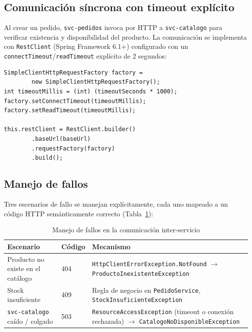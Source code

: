 \documentclass[11pt,a4paper]{article}
\begin{document}
\subsection{Comunicación síncrona con timeout explícito}

Al crear un pedido, \texttt{svc-pedidos} invoca por HTTP a
\texttt{svc-catalogo} para verificar existencia y disponibilidad del producto.
La comunicación se implementa con \texttt{RestClient} (Spring Framework 6.1+)
configurado con un \texttt{connectTimeout}/\texttt{readTimeout} explícito de
2 segundos:

\begin{lstlisting}[caption={Cliente HTTP con timeout explícito hacia \texttt{svc-catalogo}}, label={lst:catalogoclient}]
SimpleClientHttpRequestFactory factory =
        new SimpleClientHttpRequestFactory();
int timeoutMillis = (int) (timeoutSeconds * 1000);
factory.setConnectTimeout(timeoutMillis);
factory.setReadTimeout(timeoutMillis);

this.restClient = RestClient.builder()
        .baseUrl(baseUrl)
        .requestFactory(factory)
        .build();
\end{lstlisting}

\subsection{Manejo de fallos}

Tres escenarios de fallo se manejan explícitamente, cada uno mapeado a un
código HTTP semánticamente correcto (Tabla~\ref{tab:fallos}):

\begin{table}[h!]
    \centering
    \small
    \begin{tabular}{@{}p{4.2cm}p{2cm}p{6.5cm}@{}}
        \toprule
        \textbf{Escenario} & \textbf{Código} & \textbf{Mecanismo} \\
        \midrule
        Producto no existe en el catálogo & 404 & \texttt{HttpClientErrorException.NotFound} $\to$ \texttt{ProductoInexistenteException} \\
        Stock insuficiente & 409 & Regla de negocio en \texttt{PedidoService}, \texttt{StockInsuficienteException} \\
        \texttt{svc-catalogo} caído / colgado & 503 & \texttt{ResourceAccessException} (timeout o conexión rechazada) $\to$ \texttt{CatalogoNoDisponibleException} \\
        \bottomrule
    \end{tabular}
    \caption{Manejo de fallos en la comunicación inter-servicio}
    \label{tab:fallos}
\end{table}
\end{document}
